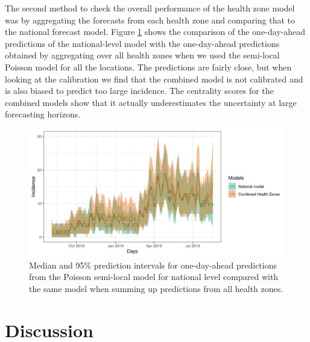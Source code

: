 \documentclass[12pt]{article}
\begin{document}
The second method to check the overall performance of the health zone model was by aggregating the forecasts from each health zone and comparing that to the national forecast model. Figure \ref{fig:nat_nat_comb} shows the comparison of the one-day-ahead predictions of the national-level model with the one-day-ahead predictions obtained by aggregating over all health zones when we used the semi-local Poisson model for all the locations. The predictions are fairly close, but when looking at the  calibration we find that the combined model is not calibrated and is also biased to predict too large incidence. The centrality scores for the combined models show that it actually underestimates the uncertainty at large forecasting horizons. 

\begin{figure}[h!]
  \centering
  \includegraphics[width=0.9\linewidth]{../output/nat_combined.png}
  \caption{Median and 95\% prediction intervals for one-day-ahead predictions from the Poisson semi-local model for national level compared with the same model when summing up predictions from all health zones.}
  \label{fig:nat_nat_comb}
  
\end{figure}

\section{Discussion}
\end{document}
